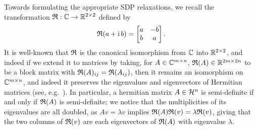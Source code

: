 Towards formulating the appropriate SDP relaxations, we recall the transformation $\mathfrak{R} : \mathbb{C} \to \mathbb{R}^{2 \times 2}$ %
defined by \[\mathfrak{R}(a + \mathrm{i}\, b) = \begin{bmatrix} a & -b \\ b & a \end{bmatrix}.\]
It is well-known that $\mathfrak{R}$ is the canonical isomorphism from $\mathbb{C}$ into $\mathbb{R}^{2 \times 2}$, and indeed if we extend it to matrices by taking, for $A \in \mathbb{C}^{m \times n}$, $\mathfrak{R}(A) \in \mathbb{R}^{2m \times 2n}$ to be a block matrix with $\mathfrak{R}(A)_{ij} = \mathfrak{R}(A_{ij})$, then it remains an isomorphism on $\mathbb{C}^{m \times n}$, and indeed it preserves the eigenvalues and eigenvectors of Hermitian matrices (see, e.g.~\cite[p.~101]{wedderburn1934matrices}).  In particular, a hermitian matrix $A \in \mathcal{H}^n$ is semi-definite if and only if $\mathfrak{R}(A)$ is semi-definite; we notice that the multiplicities of its eigenvalues are all doubled, as $A v = \lambda v$ implies $\mathfrak{R}(A) \mathfrak{R}(v) = \lambda \mathfrak{R}(v)$, giving that the two columns of $\mathfrak{R}(v)$ are each eigenvectors of $\mathfrak{R}(A)$ with eigenvalue $\lambda$.

